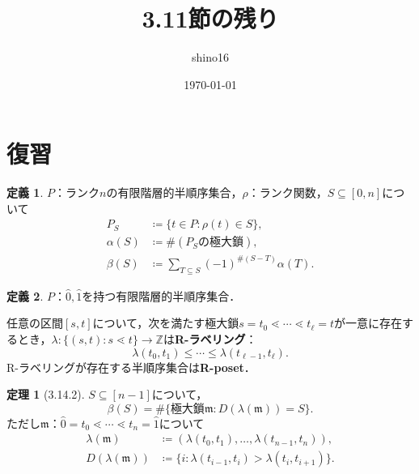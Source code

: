 \documentclass[xelatex,ja=standard,a4paper,14pt,everyparhook=compat]{bxjsarticle}
\title{3.11節の残り}
\author{shino16}
\date{\today}
\newcommand{\bbZ}{\mathbb{Z}}
\newcommand{\mkm}{\mathfrak{m}}
\theoremstyle{definition}
\newtheorem*{theorem}{定理}
\newtheorem*{definition}{定義}
\begin{document}
\maketitle

\tableofcontents

\newpage

\setcounter{section}{-1}
\section{復習}

\begin{definition}
    $P$：ランク$n$の有限階層的半順序集合，$\rho$：ランク関数，$S \subseteq [0,n]$について \begin{align*}
        P_S       & \coloneqq \{t \in P : \rho(t) \in S\},                   \\
        \alpha(S) & \coloneqq \#(\text{$P_S$の極大鎖}),                      \\
        \beta(S)  & \coloneqq \sum_{T \subseteq S} (-1)^{\#(S-T)} \alpha(T).
    \end{align*}
\end{definition}
\begin{definition}
    $P$：$\hat0,\hat1$を持つ有限階層的半順序集合．

    任意の区間$[s,t]$について，次を満たす極大鎖$s = t_0 \lessdot \cdots \lessdot t_\ell = t$が一意に存在するとき，$\lambda : \{(s,t) : s \lessdot t\} \to \bbZ$は\textbf{R-ラベリング}： \begin{equation*}
        \lambda(t_0,t_1) \leq \cdots \leq \lambda(t_{\ell-1}, t_\ell).
    \end{equation*}
    R-ラベリングが存在する半順序集合は\textbf{R-poset}．
\end{definition}
\begin{theorem}[3.14.2]
    $S \subseteq [n-1]$について， \begin{equation*}
        \beta(S) = \#\{\text{極大鎖$\mkm$} : D(\lambda(\mkm)) = S \}.
    \end{equation*}
    ただし$\mkm$：$\hat0=t_0 \lessdot \cdots \lessdot t_n = \hat1$について \begin{align*}
        \lambda(\mkm)    & \coloneqq (\lambda(t_0,t_1),\ldots,\lambda(t_{n-1},t_n)),      \\
        D(\lambda(\mkm)) & \coloneqq \{i : \lambda(t_{i-1},t_i) > \lambda(t_i,t_{i+1})\}.
    \end{align*}
\end{theorem}
\end{document}
